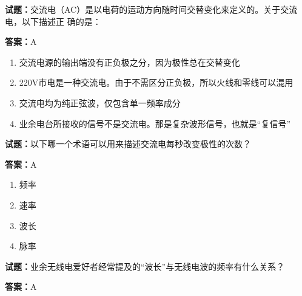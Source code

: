 \documentclass{ctexbook}
\begin{document}




\vspace{1em}

\textbf{试题：}交流电（AC）是以电荷的运动方向随时间交替变化来定义的。关于交流电，以下描述正
确的是： 

\textbf{答案：}A 

\begin{enumerate}[leftmargin=3em]
  \item 交流电源的输出端没有正负极之分，因为极性总在交替变化 

  \item 220V市电是一种交流电。由于不需区分正负极，所以火线和零线可以混用 

  \item 交流电均为纯正弦波，仅包含单一频率成分 

  \item 业余电台所接收的信号不是交流电。那是复杂波形信号，也就是“复信号” 


\end{enumerate}





\vspace{1em}

\textbf{试题：}以下哪一个术语可以用来描述交流电每秒改变极性的次数？ 

\textbf{答案：}A 

\begin{enumerate}[leftmargin=3em]
  \item 频率 

  \item 速率 

  \item 波长 

  \item 脉率 

\end{enumerate}





\vspace{1em}

\textbf{试题：}业余无线电爱好者经常提及的“波长”与无线电波的频率有什么关系？ 

\textbf{答案：}A 
\end{document}
